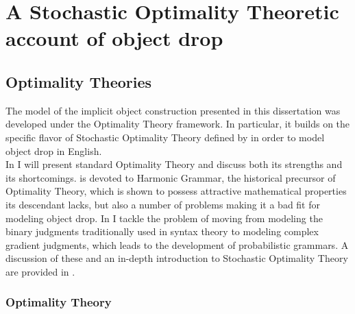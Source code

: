 \setchapterpreamble[u]{\margintoc}
\chapter{A Stochastic Optimality Theoretic account of object drop}


\section{Optimality Theories} 

The model of the implicit object construction presented in this dissertation was developed under the Optimality Theory framework. In particular, it builds on the specific flavor of Stochastic Optimality Theory defined by \textcite{Medina2007} in order to model object drop in English.\\
In  I will present standard Optimality Theory and discuss both its strengths and its shortcomings.  is devoted to Harmonic Grammar, the historical precursor of Optimality Theory, which is shown to possess attractive mathematical properties its descendant lacks, but also a number of problems making it a bad fit for modeling object drop. In  I tackle the problem of moving from modeling the binary judgments traditionally used in syntax theory to modeling complex gradient judgments, which leads to the development of probabilistic grammars. A discussion of these and an in-depth introduction to Stochastic Optimality Theory are provided in .

\subsection{Optimality Theory} 

